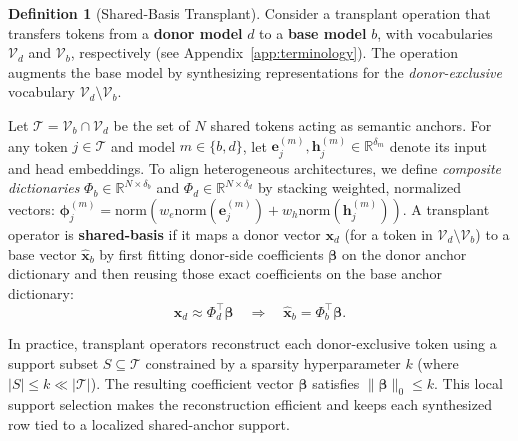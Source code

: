 \documentclass{article}
\theoremstyle{plain}
\theoremstyle{definition}
\newtheorem{definition}[theorem]{Definition}
\theoremstyle{remark}
\begin{document}
\begin{definition}[Shared-Basis Transplant]
\label{def:shared_basis}
Consider a transplant operation that transfers tokens from a \textbf{donor model} $d$ to a \textbf{base model} $b$, with vocabularies $\mathcal{V}_d$ and $\mathcal{V}_b$, respectively (see Appendix~\ref{app:terminology}). The operation augments the base model by synthesizing representations for the \textit{donor-exclusive} vocabulary $\mathcal{V}_d \setminus \mathcal{V}_b$.

Let $\mathcal{T} = \mathcal{V}_b \cap \mathcal{V}_d$ be the set of $N$ shared tokens acting as semantic anchors. For any token $j \in \mathcal{T}$ and model $m \in \{b, d\}$, let $\mathbf{e}^{(m)}_j, \mathbf{h}^{(m)}_j \in \mathbb{R}^{\delta_m}$ denote its input and head embeddings. To align heterogeneous architectures, we define \emph{composite dictionaries} $\Phi_b\in\mathbb{R}^{N\times\delta_b}$ and $\Phi_d\in\mathbb{R}^{N\times\delta_d}$ by stacking weighted, normalized vectors:
$
\boldsymbol{\phi}^{(m)}_j = \mathrm{norm}\left(w_e \mathrm{norm}(\mathbf{e}^{(m)}_j) + w_h \mathrm{norm}(\mathbf{h}^{(m)}_j)\right).
$
A transplant operator is \textbf{shared-basis} if it maps a donor vector $\mathbf{x}_d$ (for a token in $\mathcal{V}_d \setminus \mathcal{V}_b$) to a base vector $\widehat{\mathbf{x}}_b$ by first fitting donor-side coefficients $\boldsymbol{\beta}$ on the donor anchor dictionary and then reusing those exact coefficients on the base anchor dictionary:
 \begin{equation}
\label{eq:transplant}
\mathbf{x}_d\approx \Phi_d^\top \boldsymbol{\beta}
\quad\Longrightarrow\quad
\widehat{\mathbf{x}}_b = \Phi_b^\top \boldsymbol{\beta}.
\end{equation}
\end{definition}
In practice, transplant operators reconstruct each donor-exclusive token using a support subset $S \subseteq \mathcal{T}$ constrained by a sparsity hyperparameter $k$ (where $|S| \le k \ll |\mathcal{T}|$).
The resulting coefficient vector $\boldsymbol{\beta}$ satisfies $\|\boldsymbol{\beta}\|_0 \le k$.
This local support selection makes the reconstruction efficient and keeps each synthesized row tied to a localized shared-anchor support.
\end{document}
